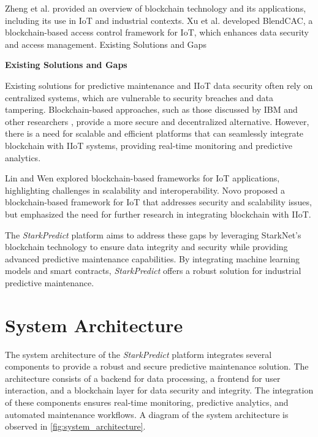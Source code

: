 \documentclass{article}
\begin{document}
Zheng et al. \cite{zheng2017overview} provided an overview of blockchain technology and its applications, including its use in IoT and industrial contexts. Xu et al. \cite{xu2019blendcac} developed BlendCAC, a blockchain-based access control framework for IoT, which enhances data security and access management.
Existing Solutions and Gaps

\noindent\textbf{Existing Solutions and Gaps}

Existing solutions for predictive maintenance and IIoT data security often rely on centralized systems, which are vulnerable to security breaches and data tampering. Blockchain-based approaches, such as those discussed by IBM and other researchers \cite{ibm2019blockchain}, provide a more secure and decentralized alternative. However, there is a need for scalable and efficient platforms that can seamlessly integrate blockchain with IIoT systems, providing real-time monitoring and predictive analytics.

Lin and Wen \cite{lin2018blockchain} explored blockchain-based frameworks for IoT applications, highlighting challenges in scalability and interoperability. Novo \cite{novo2018blockchain} proposed a blockchain-based framework for IoT that addresses security and scalability issues, but emphasized the need for further research in integrating blockchain with IIoT.

The \textit{StarkPredict} platform aims to address these gaps by leveraging StarkNet's blockchain technology to ensure data integrity and security while providing advanced predictive maintenance capabilities. By integrating machine learning models and smart contracts, \textit{StarkPredict} offers a robust solution for industrial predictive maintenance.

\section{System Architecture}

The system architecture of the \textit{StarkPredict} platform integrates several components to provide a robust and secure predictive maintenance solution. The architecture consists of a backend for data processing, a frontend for user interaction, and a blockchain layer for data security and integrity. The integration of these components ensures real-time monitoring, predictive analytics, and automated maintenance workflows. A diagram of the system architecture is observed in \autoref{fig:system_architecture}.
\end{document}

